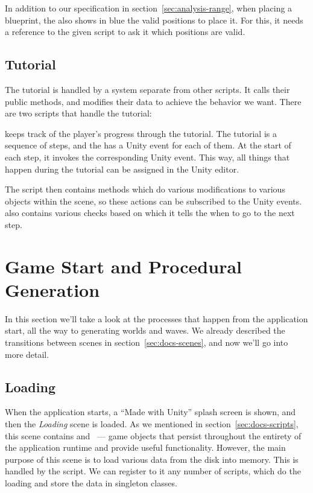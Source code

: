 In addition to our specification in section~\ref{sec:analysis-range}, when placing a blueprint, the  also shows in blue the valid positions to place it.
For this, it needs a reference to the given  script to ask it which positions are valid.

\subsection{Tutorial}

The tutorial is handled by a system separate from other scripts.
It calls their public methods, and modifies their data to achieve the behavior we want.
There are two scripts that handle the tutorial:

 keeps track of the player's progress through the tutorial.
The tutorial is a sequence of steps, and the  has a Unity event for each of them.
At the start of each step, it invokes the corresponding Unity event.
This way, all things that happen during the tutorial can be assigned in the Unity editor.

The script  then contains methods which do various modifications to various objects within the scene, so these actions can be subscribed to the  Unity events.
 also contains various checks based on which it tells the  when to go to the next step.

\section{Game Start and Procedural Generation}\label{sec:docs-data}

In this section we'll take a look at the processes that happen from the application start, all the way to generating worlds and waves.
We already described the transitions between scenes in section~\ref{sec:docs-scenes}, and now we'll go into more detail.

\subsection{Loading}

When the application starts, a \enquote{Made with Unity} splash screen is shown, and then the \emph{Loading} scene is loaded.
As we mentioned in section~\ref{sec:docs-scripts}, this scene contains  and ~--- game objects that persist throughout the entirety of the application runtime and provide useful functionality.
However, the main purpose of this scene is to load various data from the disk into memory.
This is handled by the  script.
We can register to it any number of  scripts, which do the loading and store the data in singleton classes.

